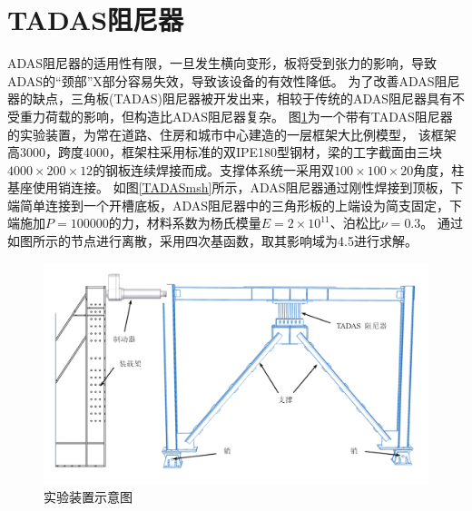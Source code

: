 \section{TADAS阻尼器}
ADAS阻尼器的适用性有限，一旦发生横向变形，板将受到张力的影响，导致ADAS的“颈部”X部分容易失效，导致该设备的有效性降低。
为了改善ADAS阻尼器的缺点，三角板(TADAS)阻尼器被开发出来，相较于传统的ADAS阻尼器具有不受重力荷载的影响，但构造比ADAS阻尼器复杂。
图\ref{TADAS1}为一个带有TADAS阻尼器的实验装置\cite{mohammadi2017}，为常在道路、住房和城市中心建造的一层框架大比例模型，
该框架高3000，跨度4000，框架柱采用标准的双IPE180型钢材，梁的工字截面由三块$4000\times200\times12$的钢板连续焊接而成。支撑体系统一采用双$100\times100\times20$角度，柱基座使用销连接。
如图\ref{TADASmsh}所示，ADAS阻尼器通过刚性焊接到顶板，下端简单连接到一个开槽底板，ADAS阻尼器中的三角形板的上端设为简支固定，下端施加$P=100000$的力，材料系数为杨氏模量$E=2\times 10^{11}$、泊松比$\nu=0.3$。
通过如图所示的节点进行离散，采用四次基函数，取其影响域为4.5进行求解。
\begin{figure}[H]
    \centering
    \includegraphics[scale=0.4]{figure/DAMPER/TADAS/1.png}
    \caption{实验装置示意图\cite{mohammadi2017}}\label{TADAS1}
\end{figure}
